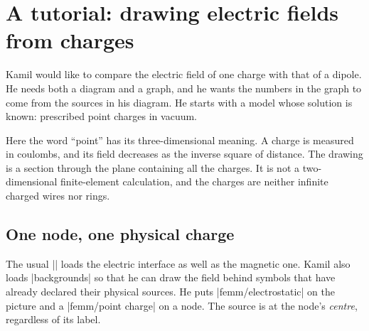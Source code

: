 \section{A tutorial: drawing electric fields from charges}
\label{sec:tutorial-electric}

Kamil would like to compare the electric field of one charge with that of a
dipole. He needs both a diagram and a graph, and he wants the numbers in the
graph to come from the sources in his diagram. He starts with a model whose
solution is known: prescribed point charges in vacuum.

Here the word ``point'' has its three-dimensional meaning. A charge is measured
in coulombs, and its field decreases as the inverse square of distance.
The drawing is a section through the plane containing all the charges.
It is not a two-dimensional finite-element calculation, and the charges are
neither infinite charged wires nor rings.

\subsection{One node, one physical charge}
The usual |\usetikzlibrary{femm}| loads the electric interface as well as the
magnetic one. Kamil also loads |backgrounds| so that he can draw the field behind
symbols that have already declared their physical sources.
He puts |femm/electrostatic| on the picture and a |femm/point charge| on a node.
The source is at the node's \emph{centre}, regardless of its label.

\begin{codeexample}
\usetikzlibrary{backgrounds}
\end{codeexample}

\begin{codeexample}[width=0pt]
\end{codeexample}

